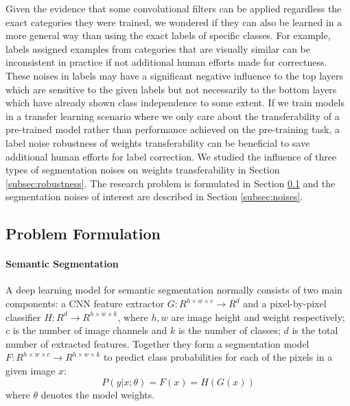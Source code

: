 Given the evidence that some convolutional filters can be applied regardless the exact categories they were trained, we wondered if they can also be learned in a more general way than using the exact labels of specific classes.
For example, labels assigned examples from categories that are visually similar can be inconsistent in practice if not additional human efforts made for correctness.
These noises in labels may have a significant negative influence to the top layers which are sensitive to the given labels but not necessarily to the bottom layers which have already shown class independence to some extent.
If we train models in a transfer learning scenario where we only care about the transferability of a pre-trained model rather than performance achieved on the pre-training task, a label noise robustness of weights transferability can be beneficial to save additional human efforts for label correction.
We studied the influence of three types of segmentation noises on weights transferability in Section \ref{subsec:robustness}.
The research problem is formulated in Section \ref{subsec:formulation} and the segmentation noises of interest are described in Section \ref{subsec:noises}.


\subsection{Problem Formulation}
\label{subsec:formulation}

\paragraph{Semantic Segmentation}
\noindent \textit{}
A deep learning model for semantic segmentation normally consists of two main components: a CNN feature extractor $G: R^{h \times w \times c} \rightarrow R^{d}$ and a pixel-by-pixel classifier $H: R^{d} \rightarrow R^{h \times w \times k}$, where $h, w$ are image height and weight respectively; $c$ is the number of image channels and $k$ is the number of classes; $d$ is the total number of extracted features.
Together they form a segmentation model $F: R^{h \times w \times c} \rightarrow R^{h \times w \times k}$ to predict class probabilities for each of the pixels in a given image $x$:
$$P(y \vert x; \theta) = F(x) = H(G(x))$$
where $\theta$ denotes the model weights.

